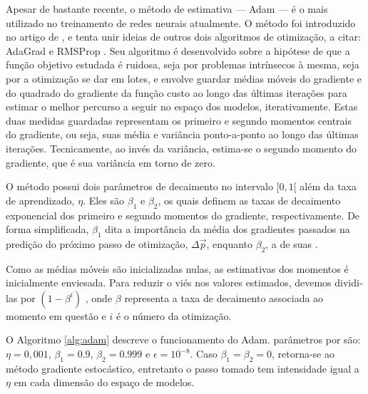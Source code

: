       Apesar de bastante recente, o método de estimativa \DIFdelbegin {}\DIFdelend \DIFaddbegin {}\DIFaddend --- \DIFaddbegin \textit{}\DIFadd{, }\DIFaddend Adam --- é o mais utilizado no treinamento de redes neurais atualmente. O método foi introduzido no artigo de , e tenta unir ideias de outros dois algoritmos de otimização, a citar: AdaGrad  e RMSProp . Seu algoritmo é desenvolvido sobre a hipótese de que a função objetivo estudada é ruidosa, seja por problemas intrínsecos à mesma, seja por a otimização se dar em lotes, e envolve guardar médias móveis do gradiente e do quadrado do gradiente da função custo ao longo das últimas iterações para estimar o melhor percurso a seguir no espaço dos modelos, iterativamente. Estas duas medidas guardadas representam os primeiro e segundo momentos centrais do gradiente, ou seja, suas média e variância ponto-a-ponto ao longo das últimas iterações. Tecnicamente, ao invés da variância, estima-se o segundo momento do gradiente, que é sua variância em torno de zero.

      O método possui dois parâmetros de decaimento no intervalo $[0,1[$ além da taxa de aprendizado, $\eta$. Eles são $\beta_1$ e $\beta_2$, os quais definem as taxas de decaimento exponencial dos primeiro e segundo momentos do gradiente, respectivamente. De forma simplificada, $\beta_1$ dita a importância da média dos gradientes passados na predição do próximo passo de otimização, $\Delta \vec{p}$, enquanto $\beta_2$, a de suas \DIFdelbegin {}\DIFdelend \DIFaddbegin {}\DIFaddend .

      Como as médias móveis são inicializadas nulas, as estimativas dos momentos é inicialmente enviesada. Para reduzir o viés nos valores estimados, devemos dividi-las por $(1-\beta^i)$ , onde $\beta$ representa a taxa de decaimento associada ao momento em questão e $i$ é o número da otimização.

      O Algoritmo \ref{alg:adam} descreve o funcionamento do Adam. \DIFdelbegin {}\DIFdelend \DIFaddbegin {}\DIFaddend parâmetros \DIFdelbegin {}\DIFdelend \DIFaddbegin {}\DIFaddend por  são: $\eta= 0,001$, $\beta_1= 0.9$, $\beta_2= 0.999$ e $\epsilon= 10^{-8}$. Caso $\beta_1 = \beta_2 = 0$, retorna-se ao método gradiente estocástico, entretanto o passo tomado tem intensidade igual a $\eta$ em cada dimensão do espaço de modelos.

